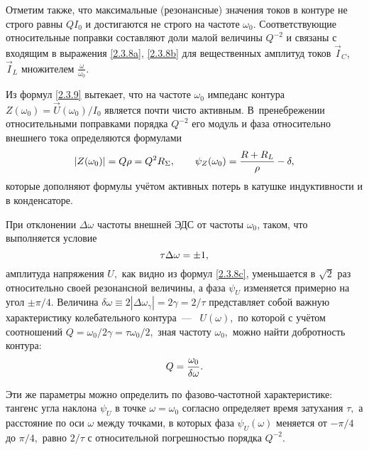 Отметим также, что максимальные (резонансные) значения токов в контуре 
не строго равны $QI_0$ и достигаются не строго на частоте $\omega_0$.
Соответствующие относительные поправки составляют доли малой 
величины $Q^{-2}$ и связаны с входящим в выражения 
\eqref{2.3.8a}, \eqref{2.3.8b} для вещественных амплитуд 
токов $\vec{I}_{\! C}$, $\vec{I}_{\! L}$ множителем $\frac{\omega}{\omega_0}$.

Из формул \eqref{2.3.9} вытекает, что на частоте $\omega_0$ импеданс контура
$Z(\omega_0)=\vec U(\omega_0)/I_0$ является почти чисто активным. В~пренебрежении 
относительными поправками порядка $Q^{-2}$ его модуль и фаза относительно внешнего 
тока определяются формулами
\begin{equation}\eqmark{2.3.10}
|Z(\omega_0)|=Q\rho=Q^2R_{\Sigma}, \qquad
\psi_Z(\omega_0)=\dfrac{R+R_L}{\rho}-\delta,
\end{equation}
которые дополняют формулы  учётом активных потерь в катушке
индуктивности и в конденсаторе.

При отклонении $\Delta\omega$ частоты внешней ЭДС от частоты $\omega_0$, таком,
что выполняется условие
\begin{equation}\eqmark{2.3.11}
\tau\Delta\omega=\pm1,
\end{equation}
амплитуда напряжения $U,$ как видно из формул \eqref{2.3.8c}, уменьшается в
$\sqrt{2}$ раз относительно своей резонансной величины, а фаза $\psi_U$
изменяется примерно на угол $\pm\pi/4.$
Величина $\delta\omega\equiv2|\Delta\omega_{\gamma}|=2\gamma=2/\tau$
представляет собой важную характеристику колебательного
контура~---~ $U(\omega),$ по которой с
учётом соотношений $Q=\omega_0/2\gamma=\tau\omega_0/2,$ зная частоту $\omega_0,$
можно найти добротность контура: 
\begin{equation}\eqmark{2.3.12}
Q=\dfrac{\omega_0}{\delta\omega}.
\end{equation}

Эти же параметры можно определить по фазово-частотной характеристике: тангенс
угла наклона $\psi_U$ в точке $\omega=\omega_0$ согласно 
определяет время затухания $\tau,$ а расстояние по оси $\omega$ между точками, в
которых фаза $\psi_U(\omega)$ меняется от $-\pi/4$ до $\pi/4,$ равно $2/\tau$ с
относительной погрешностью порядка $Q^{-2}.$

